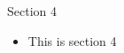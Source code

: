 \begin{frame}{Section 4}
    \begin{itemize}
        \item This is section 4
    \end{itemize}
\end{frame}